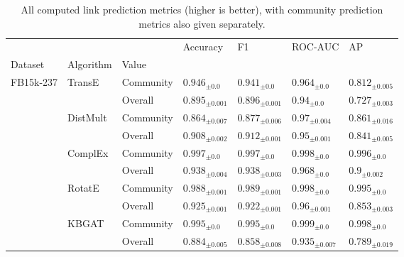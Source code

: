 \begin{table}[hb!]
  \caption[All computed link prediction metrics.]{All computed link prediction metrics (higher is better), with community prediction metrics also given separately.}
  \label{tab:performance_link_prediction}
  \centering
    \begin{adjustbox}{width=\textwidth}%
\begin{tabular}{lllllll}
\toprule
         &           &         &                 Accuracy &                       F1 &                  ROC-AUC &                       AP \\
Dataset & Algorithm & Value &                          &                          &                          &                          \\
\midrule
FB15k-237 & TransE & Community &    ${{0.946}_{\pm 0.0}}$ &    ${{0.941}_{\pm 0.0}}$ &    ${{0.964}_{\pm 0.0}}$ &  ${{0.812}_{\pm 0.005}}$ \\
         &           & Overall &  ${{0.895}_{\pm 0.001}}$ &  ${{0.896}_{\pm 0.001}}$ &     ${{0.94}_{\pm 0.0}}$ &  ${{0.727}_{\pm 0.003}}$ \\
         & DistMult & Community &  ${{0.864}_{\pm 0.007}}$ &  ${{0.877}_{\pm 0.006}}$ &   ${{0.97}_{\pm 0.004}}$ &  ${{0.861}_{\pm 0.016}}$ \\
         &           & Overall &  ${{0.908}_{\pm 0.002}}$ &  ${{0.912}_{\pm 0.001}}$ &   ${{0.95}_{\pm 0.001}}$ &  ${{0.841}_{\pm 0.005}}$ \\
         & ComplEx & Community &    ${{0.997}_{\pm 0.0}}$ &    ${{0.997}_{\pm 0.0}}$ &    ${{0.998}_{\pm 0.0}}$ &    ${{0.996}_{\pm 0.0}}$ \\
         &           & Overall &  ${{0.938}_{\pm 0.004}}$ &  ${{0.938}_{\pm 0.003}}$ &    ${{0.968}_{\pm 0.0}}$ &    ${{0.9}_{\pm 0.002}}$ \\
         & RotatE & Community &  ${{0.988}_{\pm 0.001}}$ &  ${{0.989}_{\pm 0.001}}$ &    ${{0.998}_{\pm 0.0}}$ &    ${{0.995}_{\pm 0.0}}$ \\
         &           & Overall &  ${{0.925}_{\pm 0.001}}$ &  ${{0.922}_{\pm 0.001}}$ &   ${{0.96}_{\pm 0.001}}$ &  ${{0.853}_{\pm 0.003}}$ \\
         & KBGAT & Community &    ${{0.995}_{\pm 0.0}}$ &    ${{0.995}_{\pm 0.0}}$ &    ${{0.999}_{\pm 0.0}}$ &    ${{0.998}_{\pm 0.0}}$ \\
         &           & Overall &  ${{0.884}_{\pm 0.005}}$ &  ${{0.858}_{\pm 0.008}}$ &  ${{0.935}_{\pm 0.007}}$ &  ${{0.789}_{\pm 0.019}}$ \\

\end{tabular}
\end{adjustbox}
\end{table}
